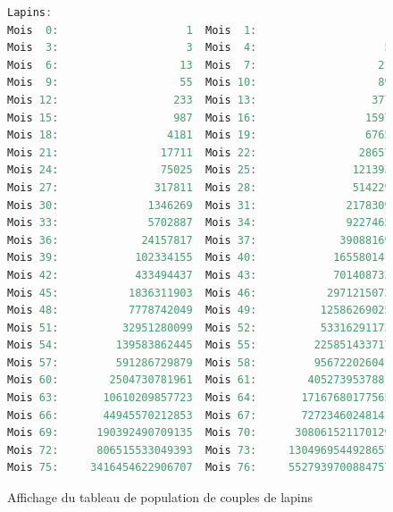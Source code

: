\documentclass{article}
\begin{document}
\begin{figure}[!ht]
\caption{Affichage du tableau de population de couples de lapins}
\begin{lstlisting}[language=c++]  
Lapins: 
Mois  0:                    1  Mois  1:                    1  Mois  2:                    2  
Mois  3:                    3  Mois  4:                    5  Mois  5:                    8  
Mois  6:                   13  Mois  7:                   21  Mois  8:                   34  
Mois  9:                   55  Mois 10:                   89  Mois 11:                  144  
Mois 12:                  233  Mois 13:                  377  Mois 14:                  610  
Mois 15:                  987  Mois 16:                 1597  Mois 17:                 2584  
Mois 18:                 4181  Mois 19:                 6765  Mois 20:                10946  
Mois 21:                17711  Mois 22:                28657  Mois 23:                46368  
Mois 24:                75025  Mois 25:               121393  Mois 26:               196418  
Mois 27:               317811  Mois 28:               514229  Mois 29:               832040  
Mois 30:              1346269  Mois 31:              2178309  Mois 32:              3524578  
Mois 33:              5702887  Mois 34:              9227465  Mois 35:             14930352  
Mois 36:             24157817  Mois 37:             39088169  Mois 38:             63245986  
Mois 39:            102334155  Mois 40:            165580141  Mois 41:            267914296  
Mois 42:            433494437  Mois 43:            701408733  Mois 44:           1134903170  
Mois 45:           1836311903  Mois 46:           2971215073  Mois 47:           4807526976  
Mois 48:           7778742049  Mois 49:          12586269025  Mois 50:          20365011074  
Mois 51:          32951280099  Mois 52:          53316291173  Mois 53:          86267571272  
Mois 54:         139583862445  Mois 55:         225851433717  Mois 56:         365435296162  
Mois 57:         591286729879  Mois 58:         956722026041  Mois 59:        1548008755920  
Mois 60:        2504730781961  Mois 61:        4052739537881  Mois 62:        6557470319842  
Mois 63:       10610209857723  Mois 64:       17167680177565  Mois 65:       27777890035288  
Mois 66:       44945570212853  Mois 67:       72723460248141  Mois 68:      117669030460994  
Mois 69:      190392490709135  Mois 70:      308061521170129  Mois 71:      498454011879264  
Mois 72:      806515533049393  Mois 73:     1304969544928657  Mois 74:     2111485077978050  
Mois 75:     3416454622906707  Mois 76:     5527939700884757  Mois 77:     8944394323791464  

\end{lstlisting}
\end{figure}
\end{document}
